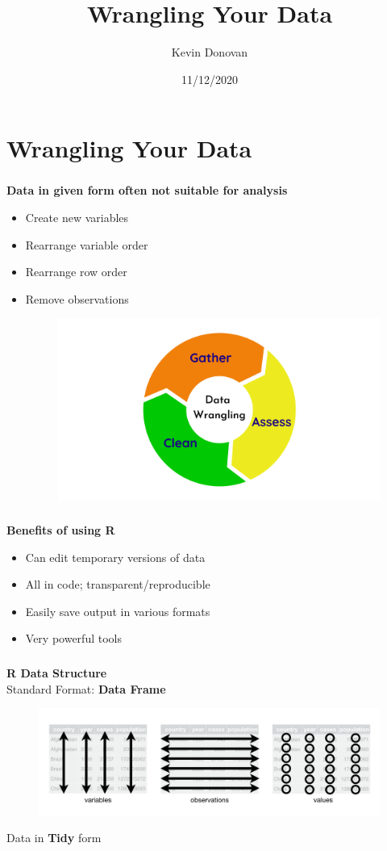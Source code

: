 \documentclass[xcolor=dvipsnames]{beamer}
\title[Data Management]{Wrangling Your Data}
\author[Kevin Donovan]{Kevin Donovan}
\institute[UNC and IBIS]{UNC-Chapel Hill and IBIS Network}
\date[11/12/2020]{11/12/2020}
\begin{document}
\begin{frame}
	\titlepage
\end{frame}

\section{Wrangling Your Data}
\begin{frame}
\frametitle{\insertsectionhead}
\textbf{Data in given form often not suitable for analysis}
\begin{itemize}
\item Create new variables
\item Rearrange variable order
\item Rearrange row order
\item Remove observations
\begin{figure}
\includegraphics[scale=0.1]{images/data_wrangling.png}
\end{figure}
\end{itemize}
\end{frame}

\begin{frame}
\frametitle{\insertsectionhead}
\textbf{Benefits of using R}
\begin{itemize}
\item Can edit temporary versions of data
\item All in code; transparent/reproducible
\item Easily save output in various formats
\item Very powerful tools
\end{itemize}
\end{frame}

\begin{frame}
\frametitle{\insertsectionhead}
\textbf{R Data Structure}\\
Standard Format: \textbf{Data Frame}
\begin{figure}
\includegraphics[scale=0.18]{images/tidy_data.png}
\end{figure}
Data in \textbf{Tidy} form
\end{frame}
\end{document}
